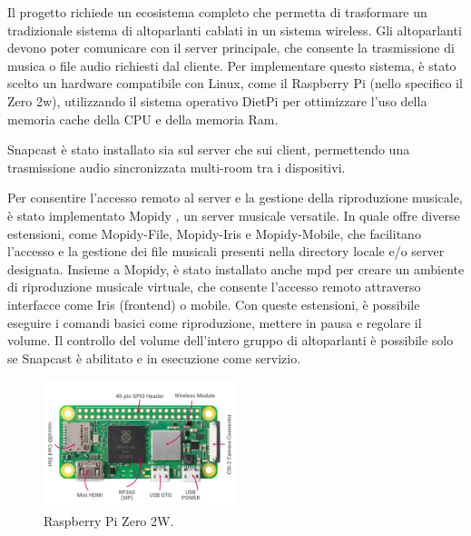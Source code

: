 Il progetto richiede un ecosistema completo che permetta di trasformare un tradizionale sistema di altoparlanti cablati in un sistema wireless. Gli altoparlanti devono poter comunicare con il server principale, che consente la trasmissione di musica o file audio richiesti dal cliente. Per implementare questo sistema, è stato scelto un hardware compatibile con Linux, come il Raspberry Pi (nello specifico il Zero 2w), utilizzando il sistema operativo DietPi per ottimizzare l’uso della memoria cache della CPU e della memoria Ram.

Snapcast è stato installato sia sul server che sui client, permettendo una trasmissione audio sincronizzata multi-room tra i dispositivi. \cite{snapcast}

Per consentire l’accesso remoto al server e la gestione della riproduzione musicale, è stato implementato Mopidy \cite{mopidy}, un server musicale versatile. In quale offre diverse estensioni, come Mopidy-File, Mopidy-Iris e Mopidy-Mobile, che facilitano l’accesso e la gestione dei file musicali presenti nella directory locale e/o server designata. Insieme a Mopidy, è stato installato anche \gls{mpd} per creare un ambiente di riproduzione musicale virtuale, che consente l’accesso remoto attraverso interfacce come Iris (frontend) o \gls{mobile}. Con queste estensioni, è possibile eseguire i comandi basici come riproduzione, mettere in pausa e regolare il volume. Il controllo del volume dell’intero gruppo di altoparlanti è possibile solo se Snapcast è abilitato e in esecuzione come servizio.

\begin{figure}[h]
    \centering
    \includegraphics[width=0.5\textwidth]{Chapters/Figures/3d_render_2w.png}
    \caption{\small Raspberry Pi Zero 2W.} 
    \label{fig:zero2w_3d_render}
\end{figure}

